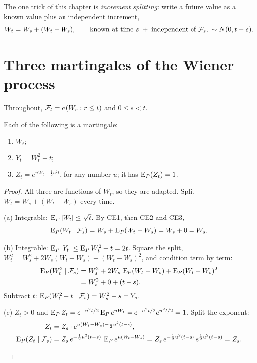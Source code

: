 The one trick of this chapter is \emph{increment splitting}: write a future value as a known value plus an independent increment,
\[
  W_t=W_s+(W_t-W_s),\qquad\text{known at time $s$}\;+\;\text{independent of }\mathcal F_s,\ \sim N(0,t-s).
\]

\section{Three martingales of the Wiener process}

Throughout, $\mathcal F_t=\sigma(W_r:r\le t)$ and $0\le s<t$.

\begin{theorem}
\label{thm:canonical}
Each of the following is a martingale:
\begin{enumerate}[label=(\alph*)]
  \item $W_t$;
  \item $Y_t=W_t^2-t$;
  \item $Z_t=e^{uW_t-\frac12u^2t}$, for any number $u$; it has $\operatorname{E}_P(Z_t)=1$.
\end{enumerate}
\end{theorem}
\begin{proof}
All three are functions of $W_t$, so they are adapted. Split $W_t=W_s+(W_t-W_s)$ every time.
\begin{steps}
  \item (a) Integrable: $\operatorname{E}_P|W_t|\le\sqrt t$. By CE1, then CE2 and CE3,
  \[
    \operatorname{E}_P(W_t\mid\mathcal F_s)=W_s+\operatorname{E}_P(W_t-W_s)=W_s+0=W_s .
  \]
  \item (b) Integrable: $\operatorname{E}_P|Y_t|\le\operatorname{E}_PW_t^2+t=2t$. Square the split, $W_t^2=W_s^2+2W_s(W_t-W_s)+(W_t-W_s)^2$, and condition term by term:
  \[
    \begin{aligned}
    \operatorname{E}_P(W_t^2\mid\mathcal F_s)&=W_s^2+2W_s\,\operatorname{E}_P(W_t-W_s)+\operatorname{E}_P(W_t-W_s)^2\\
    &=W_s^2+0+(t-s).
    \end{aligned}
  \]
  Subtract $t$: $\operatorname{E}_P(W_t^2-t\mid\mathcal F_s)=W_s^2-s=Y_s$.
  \item (c) $Z_t>0$ and $\operatorname{E}_PZ_t=e^{-u^2t/2}\operatorname{E}_Pe^{uW_t}=e^{-u^2t/2}e^{u^2t/2}=1$. Split the exponent:
  \[
    \begin{aligned}
    Z_t&=Z_s\cdot e^{u(W_t-W_s)-\frac12u^2(t-s)},\\
    \operatorname{E}_P(Z_t\mid\mathcal F_s)&=Z_s\,e^{-\frac12u^2(t-s)}\,\operatorname{E}_Pe^{u(W_t-W_s)}=Z_s\,e^{-\frac12u^2(t-s)}\,e^{\frac12u^2(t-s)}=Z_s . \qedhere
    \end{aligned}
  \]
\end{steps}
\end{proof}

